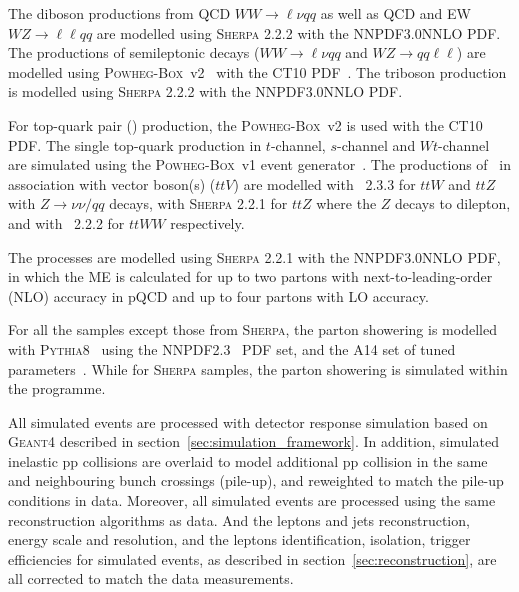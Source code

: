 The diboson productions from QCD $WW \rightarrow \ell \nu qq$ as well as QCD and EW $WZ \rightarrow \ell\ell qq$ are modelled using \textsc{Sherpa} 2.2.2 with the NNPDF3.0NNLO PDF.
The productions of semileptonic decays ($WW \rightarrow \ell\nu qq$ and $WZ \rightarrow qq\ell\ell$) are modelled using \textsc{Powheg-Box}~v2~\cite{Frixione:2007nw} with the CT10 PDF~\cite{Lai:2010vv}.
The triboson production is modelled using \textsc{Sherpa} 2.2.2 with the NNPDF3.0NNLO PDF.

For top-quark pair (\ttbar) production, the \textsc{Powheg-Box}~v2 is used with the CT10 PDF.
The single top-quark production in $t$-channel, $s$-channel and $Wt$-channel are simulated using the \textsc{Powheg-Box}~v1 event generator~\cite{Alioli:2009je,Frederix:2012dh,Re:2010bp}.
The productions of \ttbar~in association with vector boson(s) ($ttV$) are modelled with \MGMCatNLO~2.3.3 for $ttW$ and $ttZ$ with $Z \rightarrow \nu\nu/qq$ decays,
with \textsc{Sherpa} 2.2.1 for $ttZ$ where the $Z$ decays to dilepton,
and with \MGMCatNLO~2.2.2 for $ttWW$ respectively.

The \Zjet processes are modelled using \textsc{Sherpa} 2.2.1 with the NNPDF3.0NNLO PDF, 
in which the ME is calculated for up to two partons with next-to-leading-order (NLO) accuracy in pQCD and up to four partons with LO accuracy.

For all the samples except those from \textsc{Sherpa}, 
the parton showering is modelled with \textsc{Pythia8}~\cite{Sjostrand:2007gs} using the NNPDF2.3~\cite{Ball:2012cx} PDF set,
and the A14 set of tuned parameters~\cite{ATL-PHYS-PUB-2014-021}.
While for \textsc{Sherpa} samples, the parton showering is simulated within the programme.

All simulated events are processed with detector response simulation based on \textsc{Geant4} described in section~\ref{sec:simulation_framework}.
In addition, simulated inelastic pp collisions are overlaid to model additional pp collision in the same and neighbouring bunch crossings (pile-up),
and reweighted to match the pile-up conditions in data.
Moreover, all simulated events are processed using the same reconstruction algorithms as data.
And the leptons and jets reconstruction, energy scale and resolution, and the leptons identification, isolation, trigger efficiencies for simulated events,
as described in section~\ref{sec:reconstruction}, are all corrected to match the data measurements.
